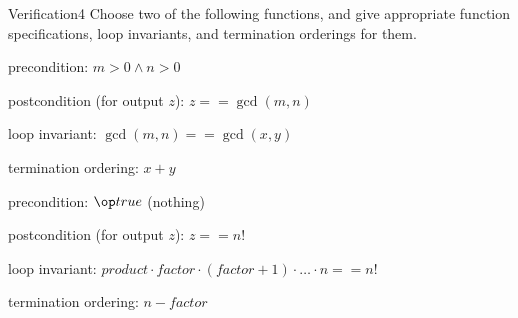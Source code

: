 \documentclass[a4paper]{article}
\begin{document}
\header

\begin{problem}{Verification}{4}
Choose two of the following functions, and give appropriate function specifications, loop invariants, and termination orderings for them.

\begin{acode}
\end{acode}

\begin{solution}
\begin{compactitem}
\item precondition: $m>0\wedge n>0$
\item postcondition (for output $z$): $z==\gcd(m,n)$
\item loop invariant: $\gcd(m,n)==\gcd(x,y)$
\item termination ordering: $x+y$
\end{compactitem}
\end{solution}

\begin{acode}
\end{acode}

\begin{solution}
\begin{compactitem}
\item precondition: $\true$ (nothing)
\item postcondition (for output $z$): $z==n!$
\item loop invariant: $product\cdot factor\cdot (factor+1)\cdot\ldots \cdot n==n!$
\item termination ordering: $n-factor$
\end{compactitem}
\end{solution}

\begin{acode}
\end{acode}


\end{problem}
\end{document}
